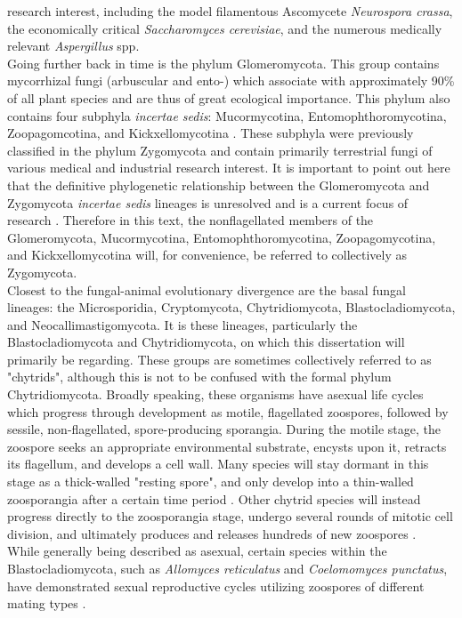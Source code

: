 research interest, including the model filamentous Ascomycete
\textit{Neurospora crassa}, the economically critical
\textit{Saccharomyces cerevisiae}, and the numerous medically relevant
\textit{Aspergillus} spp.\\
\indent Going further back in time is the phylum Glomeromycota. This
group contains mycorrhizal fungi (arbuscular and ento-) which
associate with approximately 90\% of all plant species and are thus of
great ecological importance. This phylum also contains four subphyla
\textit{incertae sedis}: Mucormycotina, Entomophthoromycotina,
Zoopagomcotina, and Kickxellomycotina \cite{White2006}. These subphyla
were previously classified in the phylum Zygomycota and contain
primarily terrestrial fungi of various medical and industrial research
interest. It is important to point out here that the definitive
phylogenetic relationship between the Glomeromycota and Zygomycota
\textit{incertae sedis} lineages is unresolved and is a current focus
of research \cite{Hibbett2007}. Therefore in this text, the
nonflagellated members of the Glomeromycota, Mucormycotina,
Entomophthoromycotina, Zoopagomycotina, and Kickxellomycotina will,
for convenience, be referred to collectively as Zygomycota.\\
\indent Closest to the fungal-animal evolutionary divergence are the
basal fungal lineages: the Microsporidia, Cryptomycota,
Chytridiomycota, Blastocladiomycota, and Neocallimastigomycota. It is
these lineages, particularly the Blastocladiomycota and
Chytridiomycota, on which this dissertation will primarily be
regarding. These groups are sometimes collectively referred to as
"chytrids", although this is not to be confused with the formal phylum
Chytridiomycota. Broadly speaking, these organisms have asexual life
cycles which progress through development as motile, flagellated
zoospores, followed by sessile, non-flagellated, spore-producing
sporangia. During the motile stage, the zoospore seeks an appropriate
environmental substrate, encysts upon it, retracts its flagellum, and
develops a cell wall. Many species will stay dormant in this stage as
a thick-walled "resting spore", and only develop into a thin-walled
zoosporangia after a certain time period \cite{James2006Blasto}. Other
chytrid species will instead progress directly to the zoosporangia
stage, undergo several rounds of mitotic cell division, and ultimately
produces and releases hundreds of new zoospores
\cite{James2006Blasto}. \\
\indent While generally being described as asexual, certain species
within the Blastocladiomycota, such as \textit{Allomyces reticulatus}
and \textit{Coelomomyces punctatus}, have demonstrated sexual
reproductive cycles utilizing zoospores of different mating types
\cite{Alexopoulos1996}.\\

